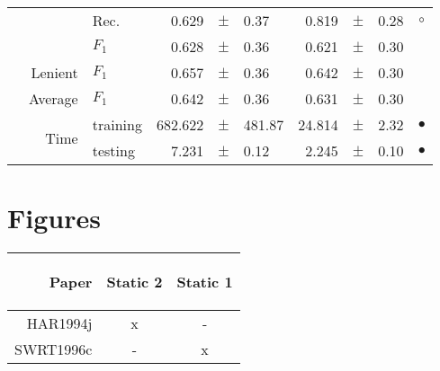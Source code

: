 \begin{longtable}{|r|r|l||rcl|rcl|c|}
\cline{3-10}
  &  &  Rec.  & 0.629 &  $\pm$  & 0.37 & 0.819 &  $\pm$  & 0.28 &  $\circ$\\
\cline{3-10}
  &  &  $F_1$  & 0.628 &  $\pm$  & 0.36 & 0.621 &  $\pm$  & 0.30 &  \\
\cline{2-10}
  & Lenient &  $F_1$  & 0.657 &  $\pm$  & 0.36 & 0.642 &  $\pm$  & 0.30 &  \\
\cline{2-10}
  & Average &  $F_1$  & 0.642 &  $\pm$  & 0.36 & 0.631 &  $\pm$  & 0.30 &  \\
\cline{2-10}
  & \multirow{2}{*}{Time} &  training  & 682.622 &  $\pm$  & 481.87 & 24.814 &  $\pm$  & 2.32 &  $\bullet$\\
\cline{3-10}
  &  &  testing  & 7.231 &  $\pm$  & 0.12 & 2.245 &  $\pm$  & 0.10 &  $\bullet$\\
\hline
\end{longtable}






\section{Figures}


\begin{tabular}{|r|c|c|}\hline
Paper &\begin{sideways}Static 2\end{sideways} &\begin{sideways}Static 1\end{sideways}\\
\hline
HAR1994j & x & -\\
SWRT1996c & - & x\\
\hline
\end{tabular}




